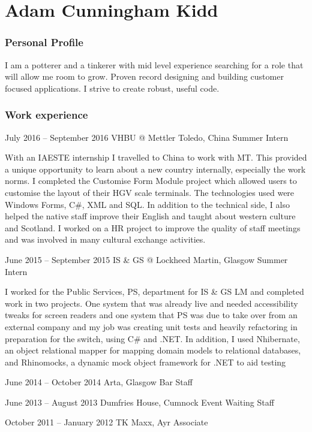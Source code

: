\documentclass{tccv}
\begin{document}
\part{Adam Cunningham Kidd }

\section{Personal Profile}
I am a potterer and a tinkerer with mid level experience searching for a role that will allow me room to grow. Proven record designing and building customer focused applications. I strive to create robust, useful code.


\section{Work experience}

\begin{eventlist}

\item{July 2016 -- September 2016}
     {VHBU @ Mettler Toledo, China}
     {Summer Intern}

With an IAESTE internship I travelled to China to work with MT. This provided a unique opportunity to learn about a new country internally, especially the work norms. I completed the Customise Form Module project which allowed users to customise the layout of their HGV scale terminals. The technologies used were Windows Forms, C\#, XML and SQL. In addition to the technical side, I also helped the native staff improve their English and taught about western culture and Scotland. I worked on a HR project to improve the quality of staff meetings and was involved in many cultural exchange activities.

\item{June 2015 -- September 2015}
     {IS \& GS @ Lockheed Martin, Glasgow}
     {Summer Intern}

I worked for the Public Services, PS, department for IS \& GS LM and completed work in two projects. One system that was already live and needed accessibility tweaks for screen readers and one system that PS was due to take over from an external company and my job was creating unit tests and heavily refactoring in preparation for the switch, using C\# and .NET. In addition, I used Nhibernate, an object relational mapper for mapping domain models to relational databases, and Rhinomocks, a dynamic mock object framework for .NET to aid testing

\item{June 2014 -- October 2014}
     {Arta, Glasgow}
     {Bar Staff}

\item{June 2013 -- August 2013}
     {Dumfries House, Cumnock}
     {Event Waiting Staff}
     
\pagebreak

\item{October 2011 -- January 2012}
     {TK Maxx, Ayr}
     {Associate}


\end{eventlist}
\end{document}
